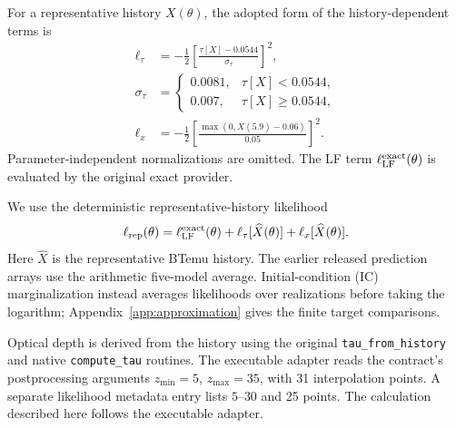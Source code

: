 For a representative history $X(\theta)$, the adopted form of the history-dependent terms is
\begin{align}
\ell_\tau&=-\frac{1}{2}\left[\frac{\tau[X]-0.0544}{\sigma_\tau}\right]^2,\\
\sigma_\tau&=\begin{cases}0.0081,&\tau[X]<0.0544,\\0.007,&\tau[X]\geq0.0544,\end{cases}\\
\ell_x&=-\frac{1}{2}\left[\frac{\max(0,X(5.9)-0.06)}{0.05}\right]^2.
\end{align}
Parameter-independent normalizations are omitted. The LF term $\ell_{\rm LF}^{\rm exact}(\theta)$ is evaluated by the original exact provider.

We use the deterministic representative-history likelihood
\begin{equation}
\ell_{\rm rep}(\theta)=\ell_{\rm LF}^{\rm exact}(\theta)
+\ell_\tau[\widehat X(\theta)]+\ell_x[\widehat X(\theta)].
\end{equation}
Here $\widehat X$ is the representative BTemu history. The earlier released prediction arrays use the arithmetic five-model average. Initial-condition (IC) marginalization instead averages likelihoods over realizations before taking the logarithm; Appendix~\ref{app:approximation} gives the finite target comparisons.

Optical depth is derived from the history using the original \texttt{tau\_from\_history} and native \texttt{compute\_tau} routines. The executable adapter reads the contract's postprocessing arguments $z_{\min}=5$, $z_{\max}=35$, with 31 interpolation points. A separate likelihood metadata entry lists $5$--$30$ and 25 points. The calculation described here follows the executable adapter.

